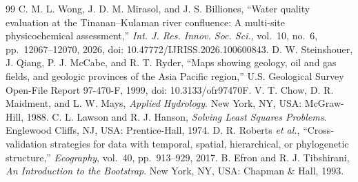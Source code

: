 \documentclass[10pt,twocolumn,letterpaper]{article}
\begin{document}
\begin{thebibliography}{99}
 C. M. L. Wong, J. D. M. Mirasol, and J. S. Billiones, ``Water quality evaluation at the Tinanan--Kulaman river confluence: A multi-site physicochemical assessment,'' \textit{Int. J. Res. Innov. Soc. Sci.}, vol.~10, no.~6, pp.~12067--12070, 2026, doi: 10.47772/IJRISS.2026.100600843.
 D. W. Steinshouer, J. Qiang, P. J. McCabe, and R. T. Ryder, ``Maps showing geology, oil and gas fields, and geologic provinces of the Asia Pacific region,'' U.S. Geological Survey Open-File Report 97-470-F, 1999, doi: 10.3133/ofr97470F.
 V. T. Chow, D. R. Maidment, and L. W. Mays, \textit{Applied Hydrology}. New York, NY, USA: McGraw-Hill, 1988.
 C. L. Lawson and R. J. Hanson, \textit{Solving Least Squares Problems}. Englewood Cliffs, NJ, USA: Prentice-Hall, 1974.
 D. R. Roberts \textit{et al.}, ``Cross-validation strategies for data with temporal, spatial, hierarchical, or phylogenetic structure,'' \textit{Ecography}, vol.~40, pp.~913--929, 2017.
 B. Efron and R. J. Tibshirani, \textit{An Introduction to the Bootstrap}. New York, NY, USA: Chapman \& Hall, 1993.
\end{thebibliography}
\end{document}
